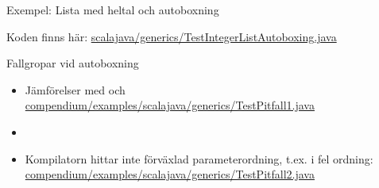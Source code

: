 \begin{Slide}{Exempel: Lista med heltal och autoboxning}

\SlideFontTiny Koden finns här: \href{https://github.com/lunduniversity/introprog/tree/master/compendium/examples/scalajava/generics/TestIntegerList.java}{scalajava/generics/TestIntegerListAutoboxing.java}
\end{Slide}

\begin{Slide}{Fallgropar vid autoboxning}
\begin{itemize}
\item Jämförelser med \code{==} och \code{!=} \\
\href{https://github.com/lunduniversity/introprog/blob/master/compendium/examples/scalajava/generics/TestPitfall1.java}
{\SlideFontSmall  compendium/examples/scalajava/generics/TestPitfall1.java}
\item[]
\item Kompilatorn hittar inte förväxlad parameterordning, t.ex.  i fel ordning: \sout{}\\
\href{https://github.com/lunduniversity/introprog/blob/master/compendium/examples/scalajava/generics/TestPitfall2.java}
{\SlideFontSmall compendium/examples/scalajava/generics/TestPitfall2.java}
\end{itemize}
\end{Slide}


